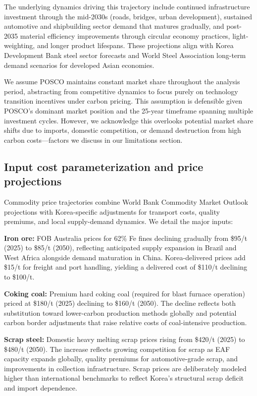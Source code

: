\documentclass[preprint,1p,authoryear]{elsarticle}
\begin{document}
The underlying dynamics driving this trajectory include continued infrastructure investment through the mid-2030s (roads, bridges, urban development), sustained automotive and shipbuilding sector demand that matures gradually, and post-2035 material efficiency improvements through circular economy practices, light-weighting, and longer product lifespans. These projections align with Korea Development Bank steel sector forecasts and World Steel Association long-term demand scenarios for developed Asian economies.

We assume POSCO maintains constant market share throughout the analysis period, abstracting from competitive dynamics to focus purely on technology transition incentives under carbon pricing. This assumption is defensible given POSCO's dominant market position and the 25-year timeframe spanning multiple investment cycles. However, we acknowledge this overlooks potential market share shifts due to imports, domestic competition, or demand destruction from high carbon costs—factors we discuss in our limitations section.

\subsection{Input cost parameterization and price projections}

Commodity price trajectories combine World Bank Commodity Market Outlook projections with Korea-specific adjustments for transport costs, quality premiums, and local supply-demand dynamics. We detail the major inputs:

\textbf{Iron ore:} FOB Australia prices for 62\% Fe fines declining gradually from \$95/t (2025) to \$85/t (2050), reflecting anticipated supply expansion in Brazil and West Africa alongside demand maturation in China. Korea-delivered prices add \$15/t for freight and port handling, yielding a delivered cost of \$110/t declining to \$100/t.

\textbf{Coking coal:} Premium hard coking coal (required for blast furnace operation) priced at \$180/t (2025) declining to \$160/t (2050). The decline reflects both substitution toward lower-carbon production methods globally and potential carbon border adjustments that raise relative costs of coal-intensive production.

\textbf{Scrap steel:} Domestic heavy melting scrap prices rising from \$420/t (2025) to \$480/t (2050). The increase reflects growing competition for scrap as EAF capacity expands globally, quality premiums for automotive-grade scrap, and improvements in collection infrastructure. Scrap prices are deliberately modeled higher than international benchmarks to reflect Korea's structural scrap deficit and import dependence.
\end{document}
